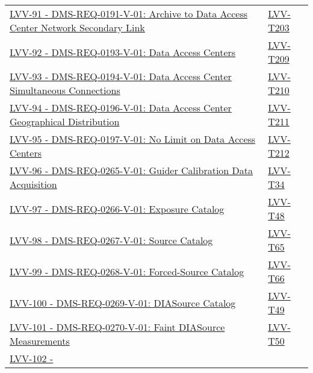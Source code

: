 \begin{longtable}[]{p{13cm}p{3cm}}
\href{https://jira.lsstcorp.org/browse/LVV-91}{LVV-91 -
DMS-REQ-0191-V-01: Archive to Data Access Center Network Secondary Link}
&
\protect\hyperlink{lvv-t203---verify-implementation-of-archive-to-data-access-center-network-secondary-link-dms-req-0191}{LVV-T203}\tabularnewline
\href{https://jira.lsstcorp.org/browse/LVV-92}{LVV-92 -
DMS-REQ-0193-V-01: Data Access Centers} &
\protect\hyperlink{lvv-t209---verify-implementation-of-data-access-centers-dms-req-0193}{LVV-T209}\tabularnewline
\href{https://jira.lsstcorp.org/browse/LVV-93}{LVV-93 -
DMS-REQ-0194-V-01: Data Access Center Simultaneous Connections} &
\protect\hyperlink{lvv-t210---verify-implementation-of--data-access-center-simultaneous-connections-dms-req-0194}{LVV-T210}\tabularnewline
\href{https://jira.lsstcorp.org/browse/LVV-94}{LVV-94 -
DMS-REQ-0196-V-01: Data Access Center Geographical Distribution} &
\protect\hyperlink{lvv-t211---verify-implementation-of-data-access-center-geographical-distribution-dms-req-0196}{LVV-T211}\tabularnewline
\href{https://jira.lsstcorp.org/browse/LVV-95}{LVV-95 -
DMS-REQ-0197-V-01: No Limit on Data Access Centers} &
\protect\hyperlink{lvv-t212---verify-implementation-of-no-limit-on-data-access-centers-dms-req-0197}{LVV-T212}\tabularnewline
\href{https://jira.lsstcorp.org/browse/LVV-96}{LVV-96 -
DMS-REQ-0265-V-01: Guider Calibration Data Acquisition} &
\protect\hyperlink{lvv-t34---verify-implementation-of-guider-calibration-data-acquisition-dms-req-0265}{LVV-T34}\tabularnewline
\href{https://jira.lsstcorp.org/browse/LVV-97}{LVV-97 -
DMS-REQ-0266-V-01: Exposure Catalog} &
\protect\hyperlink{lvv-t48---verify-implementation-of-exposure-catalog-dms-req-0266}{LVV-T48}\tabularnewline
\href{https://jira.lsstcorp.org/browse/LVV-98}{LVV-98 -
DMS-REQ-0267-V-01: Source Catalog} &
\protect\hyperlink{lvv-t65---verify-implementation-of-source-catalog-dms-req-0267}{LVV-T65}\tabularnewline
\href{https://jira.lsstcorp.org/browse/LVV-99}{LVV-99 -
DMS-REQ-0268-V-01: Forced-Source Catalog} &
\protect\hyperlink{lvv-t66---verify-implementation-of-forced-source-catalog-dms-req-0268}{LVV-T66}\tabularnewline
\href{https://jira.lsstcorp.org/browse/LVV-100}{LVV-100 -
DMS-REQ-0269-V-01: DIASource Catalog} &
\protect\hyperlink{lvv-t49---verify-implementation-of-diasource-catalog-dms-req-0269}{LVV-T49}\tabularnewline
\href{https://jira.lsstcorp.org/browse/LVV-101}{LVV-101 -
DMS-REQ-0270-V-01: Faint DIASource Measurements} &
\protect\hyperlink{lvv-t50---verify-implementation-of-faint-diasource-measurements-dms-req-0270}{LVV-T50}\tabularnewline
\href{https://jira.lsstcorp.org/browse/LVV-102}{LVV-102 -
}
\end{longtable}
